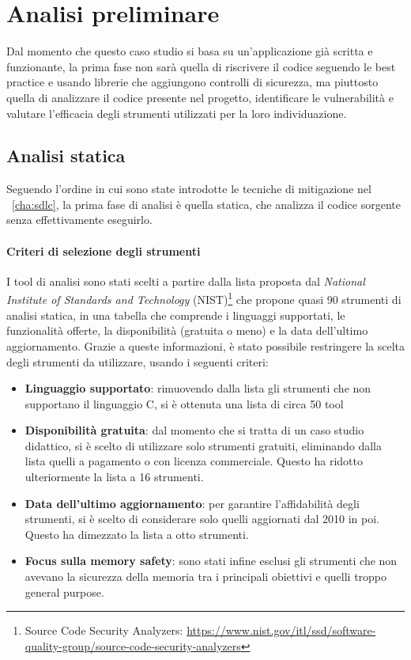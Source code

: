\section{Analisi preliminare}
\label{sec:initial_analysis}

Dal momento che questo caso studio si basa su un'applicazione già scritta e funzionante,
la prima fase non sarà quella di riscrivere il codice seguendo le best practice
e usando librerie che aggiungono controlli di sicurezza, ma piuttosto quella di analizzare
il codice presente nel progetto, identificare le vulnerabilità e valutare l'efficacia
degli strumenti utilizzati per la loro individuazione.

\subsection*{Analisi statica}
Seguendo l'ordine in cui sono state introdotte le tecniche di mitigazione nel ~\autoref{cha:sdlc},
la prima fase di analisi è quella statica, che analizza il codice sorgente senza
effettivamente eseguirlo.

\paragraph{Criteri di selezione degli strumenti}
I tool di analisi sono stati scelti a partire dalla lista proposta dal \textit{National
Institute of Standards and Technology} (NIST)\footnote{Source Code Security
Analyzers: \url{https://www.nist.gov/itl/ssd/software-quality-group/source-code-security-analyzers}}
che propone quasi 90 strumenti di analisi statica, in una tabella che comprende i
linguaggi supportati, le funzionalità offerte, la disponibilità (gratuita o meno)
e la data dell'ultimo aggiornamento. Grazie a queste informazioni, è stato possibile
restringere la scelta degli strumenti da utilizzare, usando i seguenti criteri:
\begin{itemize}
  \item \textbf{Linguaggio supportato}: rimuovendo dalla lista gli strumenti che
    non supportano il linguaggio C, si è ottenuta una lista di circa 50 tool

  \item \textbf{Disponibilità gratuita}: dal momento che si tratta di un caso studio
    didattico, si è scelto di utilizzare solo strumenti gratuiti, eliminando dalla
    lista quelli a pagamento o con licenza commerciale. Questo ha ridotto
    ulteriormente la lista a 16 strumenti.

  \item \textbf{Data dell'ultimo aggiornamento}: per garantire l'affidabilità degli
    strumenti, si è scelto di considerare solo quelli aggiornati dal 2010 in poi.
    Questo ha dimezzato la lista a otto strumenti.

  \item \textbf{Focus sulla memory safety}: sono stati infine esclusi gli strumenti
    che non avevano la sicurezza della memoria tra i principali obiettivi e quelli
    troppo general purpose.
\end{itemize}

